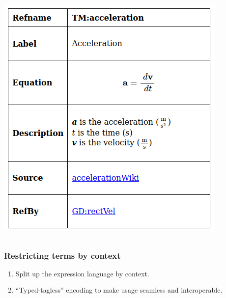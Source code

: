 \documentclass[xcolor={dvipsnames}]{beamer}
\begin{document}
\begin{frame}[fragile]
\begin{columns}
\begin{column}{0.3\textwidth}
\begin{center}
        \vspace{1em}

        \includegraphics[width=\textwidth]{abstractTheory.png}
      \end{center}
    \end{column}
  \end{columns}
\end{frame}

\begin{frame}
  \frametitle{Restricting terms by context}

  \begin{enumerate}
    \item Split up the expression language by context.
    \item ``Typed-tagless'' encoding to make usage seamless and interoperable.
  \end{enumerate}

  \begin{center}
    \Expr{} \Rightarrow{} \Expr{} \cup{} \ModelExpr{} \cup{} \CodeExpr{}
  \end{center}

  \begin{center}
    \ModelExpr{} \supseteq \Expr{} \subseteq \CodeExpr{}
  \end{center}

\end{frame}
\end{document}
